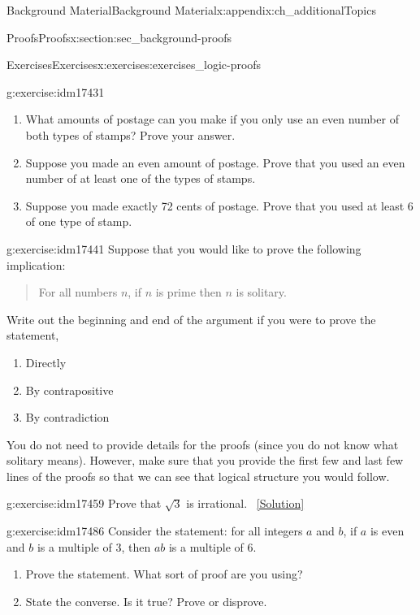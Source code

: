 \documentclass[oneside,10pt,]{book}
\numberwithin{equation}{chapter}
\begin{document}
\begin{appendixptx}{Background Material}{}{Background Material}{}{}{x:appendix:ch_additionalTopics}
\begin{sectionptx}{Proofs}{}{Proofs}{}{}{x:section:sec_background-proofs}
\begin{exercises-subsection}{Exercises}{}{Exercises}{}{}{x:exercises:exercises_logic-proofs}
\begin{divisionexercise}{4}{}{}{g:exercise:idm17431}
\begin{enumerate}[label=(\alph*)]
\item{}What amounts of postage can you make if you only use an even number of both types of stamps? Prove your answer.%
\item{}Suppose you made an even amount of postage. Prove that you used an even number of at least one of the types of stamps.%
\item{}Suppose you made exactly 72 cents of postage. Prove that you used at least 6 of one type of stamp.%
\end{enumerate}
%
\end{divisionexercise}%
\begin{divisionexercise}{5}{}{}{g:exercise:idm17441}%
Suppose that you would like to prove the following implication:%
\begin{quote}%
For all numbers \(n\), if \(n\) is prime then \(n\) is solitary.%
\end{quote}
Write out the beginning and end of the argument if you were to prove the statement,%
\par
%
\begin{enumerate}[label=(\alph*)]
\item{}Directly %
\item{}By contrapositive %
\item{}By contradiction %
\end{enumerate}
%
\par
You do not need to provide details for the proofs (since you do not know what solitary means). However, make sure that you provide the first few and last few lines of the proofs so that we can see that logical structure you would follow.%
\end{divisionexercise}%
\begin{divisionexercise}{6}{}{}{g:exercise:idm17459}%
Prove that \(\sqrt 3\) is irrational.%
\qquad~\hfill{\tiny\hyperlink{g:solution:idm17463-main}{[Solution]}}\end{divisionexercise}%
\begin{divisionexercise}{7}{}{}{g:exercise:idm17486}%
Consider the statement: for all integers \(a\) and \(b\), if \(a\) is even and \(b\) is a multiple of 3, then \(ab\) is a multiple of 6.%
\par
%
\begin{enumerate}[label=(\alph*)]
\item{}Prove the statement. What sort of proof are you using?%
\item{}State the converse. Is it true? Prove or disprove.%
\end{enumerate}

\end{divisionexercise}
\end{exercises-subsection}
\end{sectionptx}
\end{appendixptx}
\end{document}
